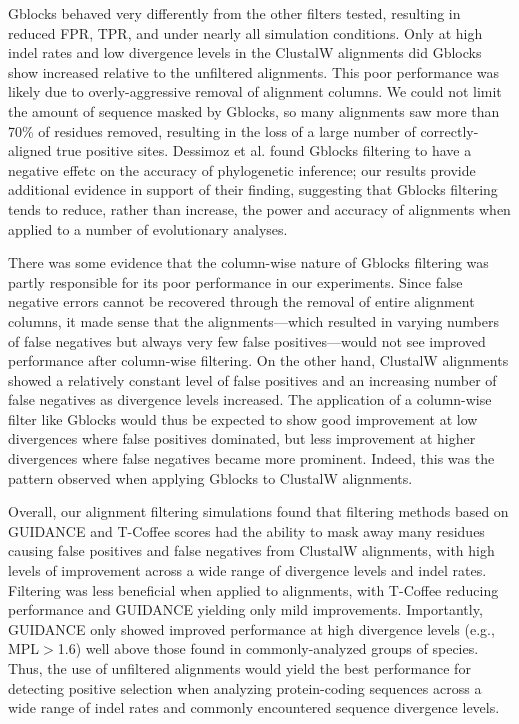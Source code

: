 \documentclass{article}
\begin{document}
Gblocks behaved very differently from the other filters tested,
resulting in reduced FPR, TPR, and \tpr under nearly all simulation
conditions. Only at high indel rates and low divergence levels in the
ClustalW alignments did Gblocks show increased \tpr relative to the
unfiltered alignments. This poor performance was likely due to
overly-aggressive removal of alignment columns. We could not limit the
amount of sequence masked by Gblocks, so many alignments saw more than
70\% of residues removed, resulting in the loss of a large number of
correctly-aligned true positive sites. Dessimoz et
al. \citeyearpar{Dessimoz2010Phylogenetic} found Gblocks filtering to
have a negative effetc on the accuracy of phylogenetic inference; our
results provide additional evidence in support of their finding,
suggesting that Gblocks filtering tends to reduce, rather than
increase, the power and accuracy of alignments when applied to a
number of evolutionary analyses.

There was some evidence that the column-wise nature of Gblocks
filtering was partly responsible for its poor performance in our
experiments. Since false negative errors cannot be recovered through
the removal of entire alignment columns, it made sense that the
\prankc alignments---which resulted in varying numbers of false
negatives but always very few false positives---would not see improved
performance after column-wise filtering. On the other hand, ClustalW
alignments showed a relatively constant level of false positives and
an increasing number of false negatives as divergence levels
increased. The application of a column-wise filter like Gblocks would
thus be expected to show good improvement at low divergences where
false positives dominated, but less improvement at higher divergences
where false negatives became more prominent. Indeed, this was the
pattern observed when applying Gblocks to ClustalW alignments.

Overall, our alignment filtering simulations found that filtering
methods based on GUIDANCE and T-Coffee scores had the ability to mask
away many residues causing false positives and false negatives from
ClustalW alignments, with high levels of improvement across a wide
range of divergence levels and indel rates. Filtering was less
beneficial when applied to \prankc alignments, with T-Coffee reducing
performance and GUIDANCE yielding only mild \tpr
improvements. Importantly, GUIDANCE only showed improved performance
at high divergence levels (e.g., MPL$>$1.6) well above those found in
commonly-analyzed groups of species. Thus, the use of unfiltered
\prankc alignments would yield the best performance for detecting \sw
positive selection when analyzing protein-coding sequences across a
wide range of indel rates and commonly encountered sequence divergence
levels.
\end{document}
